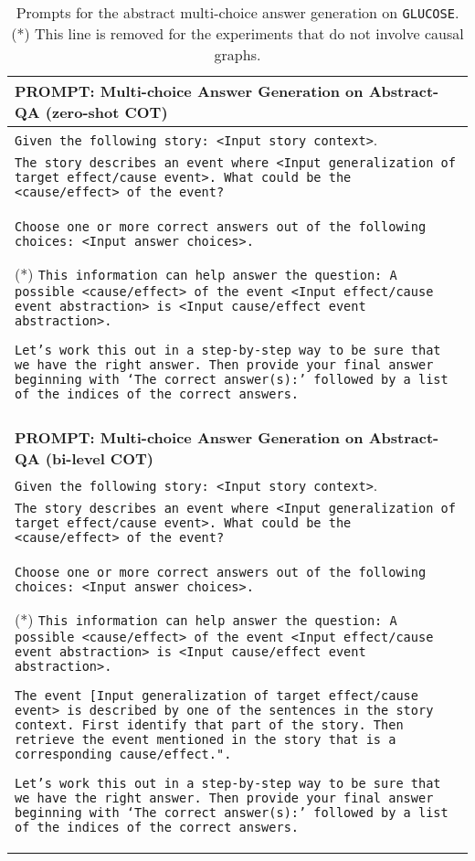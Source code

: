 \begin{table*}[!h]
    \centering
    \begin{tabular}{p{14cm}}
\toprule
\textbf{PROMPT: Multi-choice Answer Generation on Abstract-QA (zero-shot COT)}\\
\midrule

\texttt{Given the following story: <Input story context>}.  \\ 

\texttt{The story describes an event where <Input generalization of target effect/cause event>. What could be the <cause/effect> of the event?} \\

\texttt{Choose one or more correct answers out of the following choices: <Input answer choices>.}

(*) \texttt{This information can help answer the question: A possible <cause/effect> of the event <Input effect/cause event abstraction> is <Input cause/effect event abstraction>.} 

\texttt{Let’s work this out in a step-by-step way to be sure that we have the right answer. Then provide your final answer beginning with `The correct answer(s):' followed by a list of the indices of the correct answers.} \\
\bottomrule
\\
\textbf{PROMPT: Multi-choice Answer Generation on Abstract-QA (bi-level COT)}\\
\midrule

\texttt{Given the following story: <Input story context>}.  \\ 

\texttt{The story describes an event where <Input generalization of target effect/cause event>. What could be the <cause/effect> of the event?} \\

\texttt{Choose one or more correct answers out of the following choices: <Input answer choices>.}

(*) \texttt{This information can help answer the question: A possible <cause/effect> of the event <Input effect/cause event abstraction> is <Input cause/effect event abstraction>.} 

\texttt{The event [Input generalization of target effect/cause event> is described by one of the sentences in the story context. First identify that part of the story. Then retrieve the event mentioned in the story that is a corresponding cause/effect.".} 

\texttt{Let’s work this out in a step-by-step way to be sure that we have the right answer. Then provide your final answer beginning with `The correct answer(s):' followed by a list of the indices of the correct answers.} \\
\bottomrule
\end{tabular}
\caption{Prompts for the abstract multi-choice answer generation on \texttt{GLUCOSE}. (*) This line is removed for the experiments that do not involve causal graphs.}
\label{tab:prompt_abstract_qa}
\end{table*}


